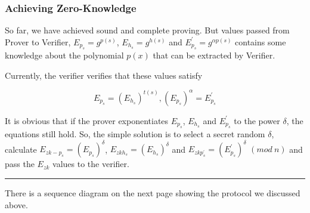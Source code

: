 \documentclass[
]{report}
\begin{document}
\subsubsection{Achieving Zero-Knowledge}

So far, we have achieved sound and complete proving. But values passed
from Prover to Verifier, \(E_{p_{s}} = g^{p(s)}\),
\(E_{h_{s}} = g^{h(s)}\) and \(E_{p_{s}}^{'} = g^{\alpha p(s)}\)
contains some knowledge about the polynomial \(p(x)\) that can be
extracted by Verifier.

Currently, the verifier verifies that these values satisfy

\[E_{p_{s}} = \left( E_{h_{s}} \right)^{t(s)},\left( E_{p_{s}} \right)^{\alpha} = E_{p_{s}}^{'}\]

It is obvious that if the prover exponentiates \(E_{p_{s}}\),
\(E_{h_{s}}\) and \(E_{p_{s}}^{'}\) to the power \(\delta\), the
equations still hold. So, the simple solution is to select a secret
random \(\delta\), calculate
\(E_{zk - p_{s}} = \left( E_{p_{s}} \right)^{\delta}\),
\(E_{zkh_{s}} = \left( E_{h_{s}} \right)^{\delta}\) and
\(E_{zkp_{s}^{'}} = \left( E_{p_{s}}^{'} \right)^{\delta}\) \((mod\ n)\)
and pass the \(E_{zk}\) values to the verifier.

\begin{center}\rule{0.5\linewidth}{0.5pt}\end{center}

There is a sequence diagram on the next page showing the protocol we discussed
above.
\end{document}
